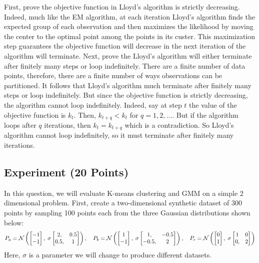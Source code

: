 \begin{enumerate}
\begin{soln}
    First, prove the objective function in Lloyd's algorithm is strictly decreasing.
    Indeed, much like the EM algorithm, at each iteration Lloyd's algorithm finds the expected group of each observation and then maximizes the likelihood by moving the center to the optimal point among the points in its custer.
    This maximization step guarantees the objective function will decrease in the next iteration of the algorithm will terminate.
    Next, prove the Lloyd's algorithm will either terminate after finitely many steps or loop indefinitely.
    There are a finite number of data points, therefore, there are a finite number of ways observations can be partitioned.
    It follows that Lloyd's algorithm much terminate after finitely many steps or loop indefinitely.
    But since the objective function is strictly decreasing, the algorithm cannot loop indefinitely.
    Indeed, say at step $t$ the value of the objective function is $k_t$.
    Then, $k_{t+q} < k_{t}$ for $q = 1, 2, \dots$.
    But if the algorithm loops after $q$ iterations, then $k_t = k_{t + q}$ which is a contradiction.
    So Lloyd's algorithm cannot loop indefinitely, so it must terminate after finitely many iterations.
\end{soln}

\end{enumerate}



\subsection{Experiment (20 Points)}

In this question, we will evaluate
K-means clustering and GMM on a simple 2 dimensional problem.
First, create a two-dimensional synthetic dataset of 300 points by sampling 100 points each from the
three Gaussian distributions shown below:
\[
P_a = \mathcal{N}\left(
\begin{bmatrix}
-1 \\ -1
\end{bmatrix},
\;
\sigma\begin{bmatrix}
2, &0.5 \\ 0.5, &1
\end{bmatrix}
\right),
\quad
P_b = \mathcal{N}\left(
\begin{bmatrix}
1 \\ -1
\end{bmatrix},
\;
 \sigma\begin{bmatrix}
1, &-0.5 \\ -0.5, &2
\end{bmatrix}
\right),
\quad
P_c = \mathcal{N}\left(
\begin{bmatrix}
0 \\ 1
\end{bmatrix},
\;
 \sigma\begin{bmatrix}
1 &0 \\ 0, &2
\end{bmatrix}
\right)
\]
Here, $\sigma$ is a parameter we will change to produce different datasets.

